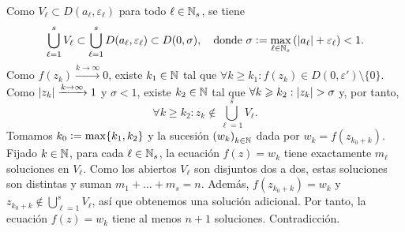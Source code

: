 \begin{dem}
    Como $V_\ell \subset D(a_\ell, \varepsilon_\ell)$ para todo $\ell \in \mathbb{N}_s$, se tiene
    \[
    \bigcup_{\ell=1}^s V_\ell \subset \bigcup_{\ell=1}^s D(a_\ell, \varepsilon_\ell) \subset D(0, \sigma), \quad \text{donde } \sigma \vcentcolon= \max_{\ell \in \mathbb{N}_s}\left(\left|a_\ell\right|+\varepsilon_\ell\right) < 1.
    \]
    Como $f(z_k) \xrightarrow{k \to \infty} 0$, existe $k_1 \in \mathbb{N}$ tal que $\forall k \geq k_1 : f(z_k) \in D(0, \varepsilon') \setminus \{0\}$.
    Como $\left|z_k\right| \xrightarrow{k \to \infty} 1$ y $\sigma < 1$, existe $k_2 \in \mathbb{N}$ tal que $\forall k \geqslant k_2 : \left|z_k\right| > \sigma$ y, por tanto,
    \[
    \forall k \geq k_2 : z_k \notin \bigcup_{\ell=1}^s V_\ell.
    \]
    Tomamos $k_0 \vcentcolon= \max\{k_1, k_2\}$ y la sucesión $\left(w_k\right)_{k\in \mathbb{N}}$ dada por $w_k = f(z_{k_0 + k})$. Fijado $k \in \mathbb{N}$, para cada $\ell \in \mathbb{N}_s$, la ecuación $f(z) = w_k$ tiene exactamente $m_\ell$ soluciones en $V_\ell$.
    Como los abiertos $V_\ell$ son disjuntos dos a dos, estas soluciones son distintas y suman $m_1 + \dots + m_s = n$. Además, $f(z_{k_0+k}) = w_k$ y $z_{k_0+k} \notin \bigcup_{\ell=1}^s V_\ell$, así que obtenemos una solución adicional.
    Por tanto, la ecuación $f(z) = w_k$ tiene al menos $n + 1$ soluciones. Contradicción. \hfill\qedsymbol
\end{dem}